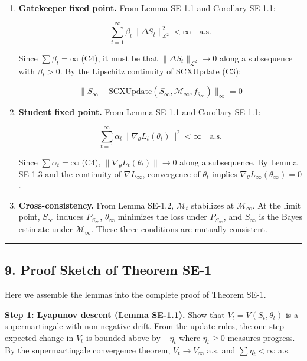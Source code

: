 \documentclass[
  12pt,
]{article}
\begin{document}
\begin{enumerate}
\def\labelenumi{\arabic{enumi}.}
\item
  \textbf{Gatekeeper fixed point.} From Lemma SE-1.1 and Corollary
  SE-1.1:

  \[
  \sum_{t=1}^\infty \beta_t \|\Delta S_t\|^2_{\mathcal{L}^2} < \infty \quad \text{a.s.}
  \]

  Since \(\sum \beta_t = \infty\) (C4), it must be that
  \(\|\Delta S_t\|_{\mathcal{L}^2} \to 0\) along a subsequence with
  \(\beta_t > 0\). By the Lipschitz continuity of SCXUpdate (C3):

  \[
  \|S_\infty - \text{SCXUpdate}(S_\infty, \mathcal{M}_\infty, f_{\theta_\infty})\|_\infty = 0
  \]
\item
  \textbf{Student fixed point.} From Lemma SE-1.1 and Corollary SE-1.1:

  \[
  \sum_{t=1}^\infty \alpha_t \|\nabla_\theta L_t(\theta_t)\|^2 < \infty \quad \text{a.s.}
  \]

  Since \(\sum \alpha_t = \infty\) (C4),
  \(\|\nabla_\theta L_t(\theta_t)\| \to 0\) along a subsequence. By
  Lemma SE-1.3 and the continuity of \(\nabla L_\infty\), convergence of
  \(\theta_t\) implies \(\nabla_\theta L_\infty(\theta_\infty) = 0\).
\item
  \textbf{Cross-consistency.} From Lemma SE-1.2, \(\mathcal{M}_t\)
  stabilizes at \(\mathcal{M}_\infty\). At the limit point, \(S_\infty\)
  induces \(P_{S_\infty}\), \(\theta_\infty\) minimizes the loss under
  \(P_{S_\infty}\), and \(S_\infty\) is the Bayes estimate under
  \(\mathcal{M}_\infty\). These three conditions are mutually
  consistent.
\end{enumerate}

\begin{center}\rule{0.5\linewidth}{0.5pt}\end{center}

\subsection{9. Proof Sketch of Theorem
SE-1}\label{proof-sketch-of-theorem-se-1}

Here we assemble the lemmas into the complete proof of Theorem SE-1.

\textbf{Step 1: Lyapunov descent (Lemma SE-1.1).} Show that
\(V_t = V(S_t, \theta_t)\) is a supermartingale with non-negative drift.
From the update rules, the one-step expected change in \(V_t\) is
bounded above by \(-\eta_t\) where \(\eta_t \geq 0\) measures progress.
By the supermartingale convergence theorem, \(V_t \to V_\infty\) a.s.
and \(\sum \eta_t < \infty\) a.s.
\end{document}
